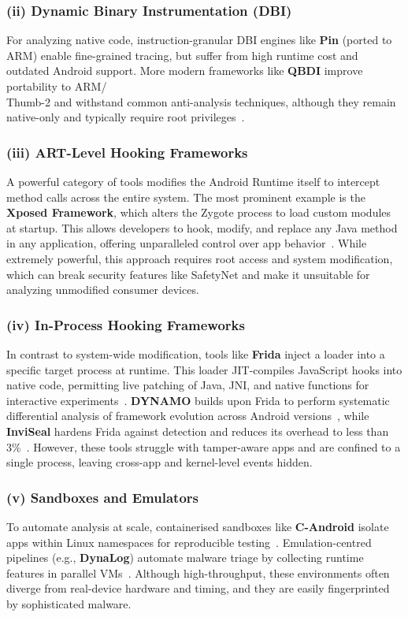 \documentclass[a4paper,12pt]{report}
\begin{document}
\subsubsection*{(ii) Dynamic Binary Instrumentation (DBI)}
For analyzing native code, instruction-granular DBI engines like \textbf{Pin} (ported to ARM) enable fine-grained tracing, but suffer from high runtime cost and outdated Android support. More modern frameworks like \textbf{QBDI} improve portability to ARM/ \\Thumb-2 and withstand common anti-analysis techniques, although they remain native-only and typically require root privileges~\cite{qbdiblackhat2020}.

\subsubsection*{(iii) ART-Level Hooking Frameworks}
A powerful category of tools modifies the Android Runtime itself to intercept method calls across the entire system. The most prominent example is the \textbf{Xposed Framework}, which alters the Zygote process to load custom modules at startup. This allows developers to hook, modify, and replace any Java method in any application, offering unparalleled control over app behavior~\cite{xposed}. While extremely powerful, this approach requires root access and system modification, which can break security features like SafetyNet and make it unsuitable for analyzing unmodified consumer devices.

\subsubsection*{(iv) In-Process Hooking Frameworks}
In contrast to system-wide modification, tools like \textbf{Frida} inject a loader into a specific target process at runtime. This loader JIT-compiles JavaScript hooks into native code, permitting live patching of Java, JNI, and native functions for interactive experiments~\cite{frida2020}. \textbf{DYNAMO} builds upon Frida to perform systematic differential analysis of framework evolution across Android versions~\cite{dynamo2021}, while \textbf{InviSeal} hardens Frida against detection and reduces its overhead to less than 3\%~\cite{inviseal2023}. However, these tools struggle with tamper-aware apps and are confined to a single process, leaving cross-app and kernel-level events hidden.

\subsubsection*{(v) Sandboxes and Emulators}
To automate analysis at scale, containerised sandboxes like \textbf{C-Android} isolate apps within Linux namespaces for reproducible testing~\cite{candroid2019}. Emulation-centred pipelines (e.g., \textbf{DynaLog}) automate malware triage by collecting runtime features in parallel VMs~\cite{dynalog2016}. Although high-throughput, these environments often diverge from real-device hardware and timing, and they are easily fingerprinted by sophisticated malware.
\end{document}
